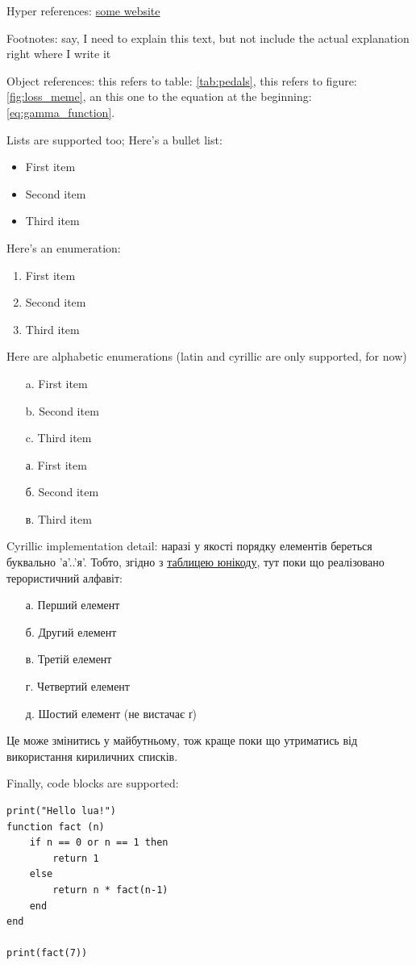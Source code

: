 \documentclass[a4paper]{article}
\newcommand{\tb}{
    \hspace*{10mm}
} %
\newcommand{\tbln}{
    \newline 
    \tb
} %
\begin{document}
\tb Hyper references: \href{https://www.somewebsite.com/}{some website}
\tbln Footnotes: say, I need to explain this text, but not include the actual explanation right where I write it\footnotemark[1]
\tbln Object references: this refers to table: \ref{tab:pedals}, this refers to figure: \ref{fig:loss_meme}, an this one to the equation at the beginning: \ref{eq:gamma_function}.
\tbln Lists are supported too; Here's a bullet list:
\begin{itemize}
\item First item
\item Second item
\item Third item
\end{itemize}\tb Here's an enumeration:
\begin{enumerate}
\item First item
\item Second item
\item Third item
\end{enumerate}\tb Here are alphabetic enumerations (latin and cyrillic are only supported, for now)
\begin{enumerate}
\item[a.] First item
\item[b.] Second item
\item[c.] Third item
\end{enumerate}
\begin{enumerate}
\item[а.] First item
\item[б.] Second item
\item[в.] Third item
\end{enumerate}\tb Cyrillic implementation detail: наразі у якості порядку елементів береться буквально 'а'..'я'. Тобто, згідно з \href{https://en.wikipedia.org/wiki/Cyrillic_(Unicode_block)}{таблицею юнікоду}, тут поки що реалізовано терористичний алфавіт:
\begin{enumerate}
\item[а.] Перший елемент
\item[б.] Другий елемент
\item[в.] Третій елемент
\item[г.] Четвертий елемент
\item[д.] Шостий елемент (не вистачає ґ)
\end{enumerate}\tb Це може змінитись у майбутньому, тож краще поки що утриматись від використання кириличних списків.
\tbln Finally, code blocks are supported:
\begin{verbatim}
print("Hello lua!")
function fact (n)
    if n == 0 or n == 1 then
        return 1
    else
        return n * fact(n-1)
    end
end

print(fact(7))
\end{verbatim}
\end{document}
